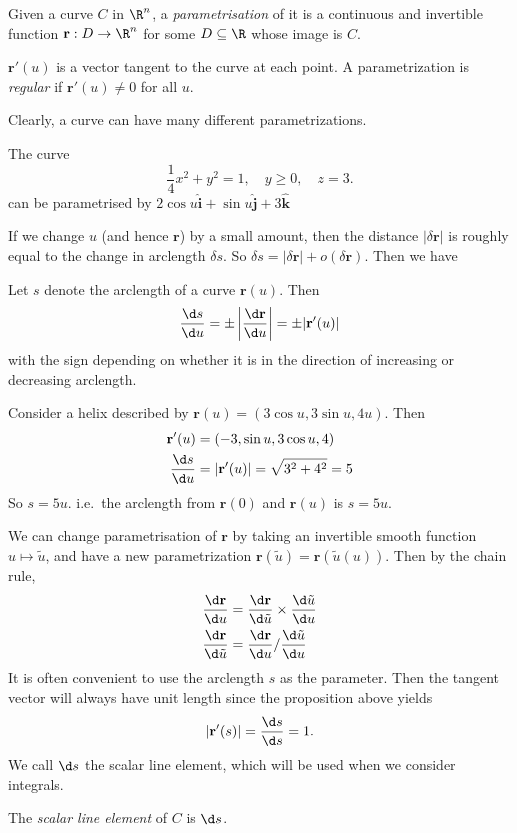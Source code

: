 \documentclass[a4paper]{article}
\begin{document}
\begin{defi}
  Given a curve $C$ in $\R^n$, a \emph{parametrisation} of it is a continuous and invertible function $\mathbf{r}: D\to \R^n$ for some $D\subseteq \R$ whose image is $C$.

  $\mathbf{r}'(u)$ is a vector tangent to the curve at each point. A parametrization is \emph{regular} if $\mathbf{r}'(u) \not= 0$ for all $u$.
\end{defi}
Clearly, a curve can have many different parametrizations.

\begin{eg}
  The curve
  \[
    \frac{1}{4}x^2 + y^2 = 1, \quad y \geq 0, \quad z = 3.
  \]
  can be parametrised by $2\cos u\hat{\mathbf{i}} + \sin u\hat{\mathbf{j}} + 3\hat{\mathbf{k}}$
\end{eg}
If we change $u$ (and hence $\mathbf{r}$) by a small amount, then the distance $|\delta \mathbf{r}|$ is roughly equal to the change in arclength $\delta s$. So $\delta s = |\delta \mathbf{r}| + o(\delta \mathbf{r})$. Then we have

\begin{prop}
  Let $s$ denote the arclength of a curve $\mathbf{r}(u)$. Then
  \[
    \frac{\d s}{\d u} = \pm \left|\frac{\d \mathbf{r}}{\d u}\right| = \pm |\mathbf{r}'(u)|
  \]
  with the sign depending on whether it is in the direction of increasing or decreasing arclength.
\end{prop}

\begin{eg}
  Consider a helix described by $\mathbf{r}(u) = (3\cos u, 3\sin u, 4u)$. Then
  \begin{align*}
    \mathbf{r}'(u) &= (-3,\sin u, 3\cos u, 4)\\
    \frac{\d s}{\d u} &= |\mathbf{r}'(u)| = \sqrt{3^2 + 4^2} = 5
  \end{align*}
  So $s = 5u$. i.e.\ the arclength from $\mathbf{r}(0)$ and $\mathbf{r}(u)$ is $s = 5u$.
\end{eg}

We can change parametrisation of $\mathbf{r}$ by taking an invertible smooth function $u\mapsto \tilde{u}$, and have a new parametrization $\mathbf{r}(\tilde{u}) = \mathbf{r}(\tilde{u}(u))$. Then by the chain rule,
\begin{align*}
  \frac{\d \mathbf{r}}{\d u} &= \frac{\d \mathbf{r}}{\d \tilde{u}}\times \frac{\d \tilde{u}}{\d u}\\
  \frac{\d \mathbf{r}}{\d \tilde{u}} &= \frac{\d \mathbf{r}}{\d u}/ \frac{\d \tilde{u}}{\d u}
\end{align*}
It is often convenient to use the arclength $s$ as the parameter. Then the tangent vector will always have unit length since the proposition above yields
\[
  |\mathbf{r}'(s)| = \frac{\d s}{\d s} = 1.
\]
We call $\d s$ the scalar line element, which will be used when we consider integrals.
\begin{defi}
  The \emph{scalar line element} of $C$ is $\d s$.
\end{defi}
\end{document}
